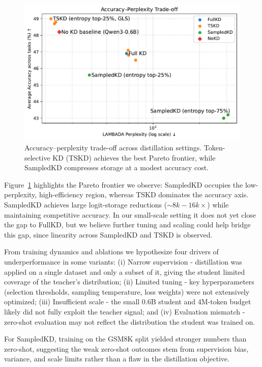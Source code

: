 \documentclass[11pt]{article}
\begin{document}
\begin{figure}[t]
\centering
\includegraphics[width=\linewidth]{fig_pareto_acc_vs_ppl.pdf}
\caption{Accuracy--perplexity trade-off across distillation settings. Token-selective KD (TSKD) achieves the best Pareto frontier, while SampledKD compresses storage at a modest accuracy cost.}
\label{fig:acc-ppl}
\end{figure}

Figure~\ref{fig:acc-ppl} highlights the Pareto frontier we observe: SampledKD occupies the low-perplexity, high-efficiency region, whereas TSKD dominates the accuracy axis.
SampledKD achieves large logit-storage reductions ($\sim8k-16k\times$) while maintaining competitive accuracy.
In our small-scale setting it does not yet close the gap to FullKD, but we believe further tuning and scaling could help bridge this gap, since linearity across SampledKD and TSKD is observed.

From training dynamics and ablations we hypothesize four drivers of underperformance in some variants:
(i) Narrow supervision - distillation was applied on a single dataset and only a subset of it, giving the student limited coverage of the teacher's distribution;
(ii) Limited tuning - key hyperparameters (selection thresholds, sampling temperature, loss weights) were not extensively optimized;
(iii) Insufficient scale - the small 0.6B student and 4M-token budget likely did not fully exploit the teacher signal; and
(iv) Evaluation mismatch - zero-shot evaluation may not reflect the distribution the student was trained on.

For SampledKD, training on the GSM8K split yielded stronger numbers than zero-shot, suggesting the weak zero-shot outcomes stem from supervision bias, variance, and scale limits rather than a flaw in the distillation objective.
\end{document}
